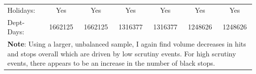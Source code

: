 \begin{tabular}{l*{6}{c}}
Holidays:   &         Yes         &         Yes         &         Yes         &         Yes         &         Yes         &         Yes         \\
Dept-Days:  &     1662125         &     1662125         &     1316377         &     1316377         &     1248626         &     1248626         \\
\hline \multicolumn{7}{p{\linewidth}}{\textbf{Note}: Using a larger, unbalanced sample, I again find volume decreases in hits and stops overall which are driven by low scrutiny events. For high scrutiny events, there appears to be an increase in the number of black stops.} \\ \hline \end{tabular}
